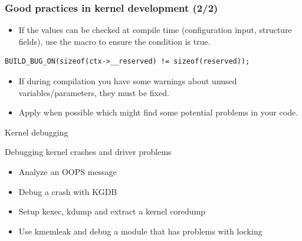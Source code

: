 \begin{frame}[fragile]
  \frametitle{Good practices in kernel development (2/2)}
  \begin{itemize}
    \item If the values can be checked at compile time (configuration input,
           structure fields), use the  macro to
          ensure the condition is true.
  \end{itemize}
  \begin{block}{}
    \begin{verbatim}
BUILD_BUG_ON(sizeof(ctx->__reserved) != sizeof(reserved));
    \end{verbatim}
  \end{block}
  \begin{itemize}
    \item If during compilation you have some warnings about unused
          variables/parameters, they must be fixed.
    \item Apply  when possible which might find some
          potential problems in your code.
  \end{itemize}
\end{frame}

\setuplabframe
{Kernel debugging}
{
  Debugging kernel crashes and driver problems
  \begin{itemize}
    \item Analyze an OOPS message
    \item Debug a crash with KGDB
    \item Setup kexec, kdump and extract a kernel coredump
    \item Use kmemleak and debug a module that has problems with locking
  \end{itemize}
}